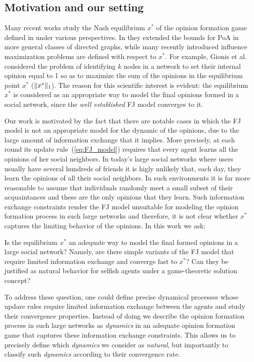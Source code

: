 \subsection{Motivation and our setting}

Many recent works study the Nash equilibrium $x^*$ of the opinion formation
game defined in \cite{BKO11} under various perspectives. In \cite{CCL16} they
extended the bounds for PoA in more general classes of directed graphs, while
many recently introduced influence maximization problems
\cite{GTT13,AKPT18,MMT17} are defined with respect to $x^*$.  For example,
Gionis et al. \cite{GTT13} considered the problem of identifying $k$ nodes in a
network to set their internal opinion equal to 1 so as to maximize the sum of
the opinions in the equilibrium point $x^*$ ($\norm{1}{x^*}$).  The reason for
this scientific interest is evident: the equilibrium $x^*$ is considered as an
appropriate way to model the final opinions formed in a social network, since
the \emph{well established} FJ model converges to it.

Our work is motivated by the fact that there are notable cases in which the FJ
model is not an appropriate model for the dynamic of the opinions, due to the
large amount of information exchange that it implies.  More precisely, at each
round its update rule~(\ref{eq:FJ_model}) requires that every agent learns all
the opinions of her social neighbors.  In today's large social networks where
users usually have several hundreds of friends it is higly unlikely that, each
day, they learn the opinions of all their social neighbors.  In such
environments it is far more reasonable to assume that individuals randomly meet
a small subset of their acquaintances and these are the only opinions that they
learn. Such information exchange constraints render the FJ model unsuitable for
modeling the opinion formation process in such large networks and therefore, it
is not clear whether $x^*$ captures the limiting behavior of the opinions. In
this work we ask:
%
\begin{question}\label{q:motivation1}
  Is the equilibrium $x^*$ an adequate way to model the final formed opinions
  in a large social network? Namely, are there simple variants of the FJ model
  that require limited information exchange and converge fast to $x^*$? Can
  they be justified as natural behavior for selfish agents under a
  game-theoretic solution concept?
\end{question}

To address these question, one could define precise dynamical processes whose
updare rules require limited information exchange between the agents and study
their convergence properties. Instead of doing we describe the opinion
formation process in such large networks as \emph{dynamics} in an adequate
opinion formation game that captures these information exchange constraints.
This allows us to precisely define which \emph{dynamics} we consider as
\emph{natural}, but importantly to classify such \emph{dynamics} according to
their convergence rate.

